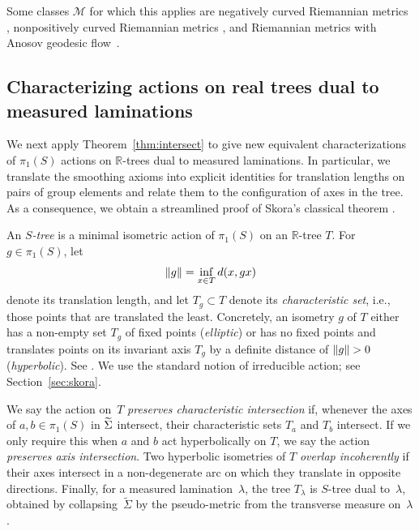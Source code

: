 Some classes $\mathcal{M}$ for which this
applies are negatively curved Riemannian metrics
\cite{Otal90:SpectreMarqueNegative,HP97:RigidityNegCurvedCone},
nonpositively curved
Riemannian metrics
\cite{CFF92:RigidityNonPosCurvedRiem,Con18:MarkedNonpos}, and
Riemannian metrics with Anosov geodesic
flow~\cite{GLP25:MarkedAnosov}.






\subsection{Characterizing actions on real trees dual to measured laminations} 

We next apply Theorem~\ref{thm:intersect} to give new equivalent characterizations of $\pi_1(S)$ actions 
on $\mathbb{R}$-trees dual to measured laminations. In
particular, we translate the smoothing axioms into explicit
identities for translation lengths on pairs of group elements and relate them to the configuration of axes in the tree. As a consequence, we obtain a streamlined proof of Skora’s classical theorem
\cite{Sko90:GeometricAction}.

An \emph{$S$-tree} is a minimal isometric action of $\pi_1(S)$ on an $\mathbb{R}$-tree $T$. 
For $g\in\pi_1(S)$, let
\[
\lVert g\rVert=\inf_{x\in T} d(x,gx)
\]
denote its translation length, and let $T_g \subset T$ denote its
\emph{characteristic set}, i.e., those points that are translated the
least. Concretely,
an isometry $g$ of $T$ either has a non-empty set $T_g$ of fixed
points (\emph{elliptic}) or
has no fixed points and translates points on its invariant
axis $T_g$ by a definite distance of $\lVert g\rVert>0$
(\emph{hyperbolic}). See \cite[\S1.3]{CM87:GroupActions}.
We use the standard notion of irreducible action; see Section~\ref{sec:skora}.

We say the action on~$T$ \emph{preserves characteristic intersection} if, whenever
the axes of $a,b \in \pi_1(S)$ in $\widetilde{\Sigma}$ intersect, their
characteristic sets $T_a$ and $T_b$ intersect.
If we only require this when $a$ and $b$ act hyperbolically on $T$,
we say the action \emph{preserves axis intersection}.
Two hyperbolic
isometries of $T$ \emph{overlap incoherently} if their axes intersect
in a
non-degenerate arc on which they translate in opposite directions.
Finally, for a measured lamination~$\lambda$, the tree $T_\lambda$ is
$S$-tree dual to~$\lambda$, obtained by collapsing~$\widetilde{\Sigma}$
by the pseudo-metric from the transverse
measure on~$\lambda$.

